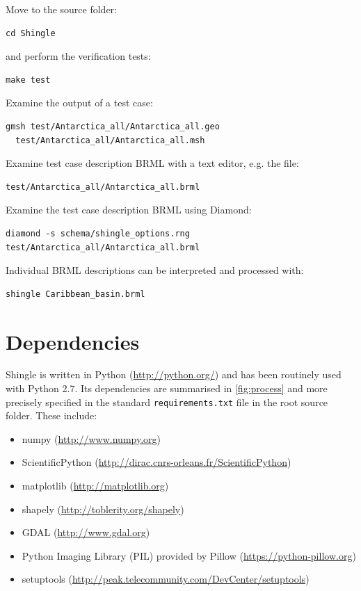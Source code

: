 \documentclass[a4paper, 10pt]{book}
\providecommand{\shingle}{Shingle\xspace}
\providecommand{\brml}{BRML\xspace}
\begin{document}
\noindent
Move to the source folder:
\begin{verbatim}
cd Shingle
\end{verbatim}

\noindent
and perform the verification tests:
\begin{verbatim}
make test
\end{verbatim}

\noindent
Examine the output of a test case:
\begin{verbatim}
gmsh test/Antarctica_all/Antarctica_all.geo 
  test/Antarctica_all/Antarctica_all.msh
\end{verbatim}

\noindent
Examine test case description \brml with a text editor, e.g. the file:
\begin{verbatim}
test/Antarctica_all/Antarctica_all.brml
\end{verbatim}

\noindent
Examine the test case description \brml using Diamond:
\begin{verbatim}
diamond -s schema/shingle_options.rng test/Antarctica_all/Antarctica_all.brml
\end{verbatim}

\noindent
Individual \brml descriptions can be interpreted and processed with:
\begin{verbatim}
shingle Caribbean_basin.brml
\end{verbatim}

\section{Dependencies}

\shingle is written in Python
(\url{http://python.org/})
and has been routinely used with Python 2.7.
Its dependencies are summarised in \cref{fig:process}
and more precisely specified 
in the standard 
\verb+requirements.txt+ file in the root source folder.
These include:

\begin{itemize}
\item numpy
  (\url{http://www.numpy.org})
\item ScientificPython
  (\url{http://dirac.cnrs-orleans.fr/ScientificPython})
\item matplotlib
  (\url{http://matplotlib.org})
\item shapely
  (\url{http://toblerity.org/shapely})
\item GDAL
  (\url{http://www.gdal.org})
\item Python Imaging Library (PIL) provided by Pillow
  (\url{https://python-pillow.org})
\item setuptools
  (\url{http://peak.telecommunity.com/DevCenter/setuptools})
\end{itemize}
\end{document}
